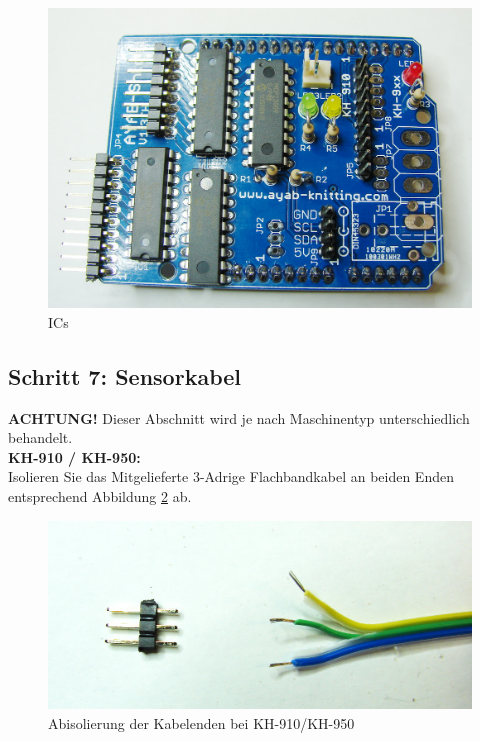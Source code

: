 \documentclass[fleqn,10pt]{SelfArx} %
\begin{document}
\begin{figure}[tbhp]\centering
\includegraphics[width=\linewidth]{abb6_1}
\caption{ICs}
\label{fig:abb6_1}
\end{figure}

\FloatBarrier

 \subsection*{Schritt 7: Sensorkabel}

\textbf{ACHTUNG!} Dieser Abschnitt wird je nach Maschinentyp unterschiedlich behandelt.\\

\textbf{KH-910 / KH-950:} \\

Isolieren Sie das Mitgelieferte 3-Adrige Flachbandkabel an beiden Enden entsprechend Abbildung \ref{fig:abb7_1} ab.

\begin{figure}[tbhp]\centering
\includegraphics[width=\linewidth]{abb7_1}
\caption{Abisolierung der Kabelenden bei KH-910/KH-950}
\label{fig:abb7_1}
\end{figure}
\end{document}
